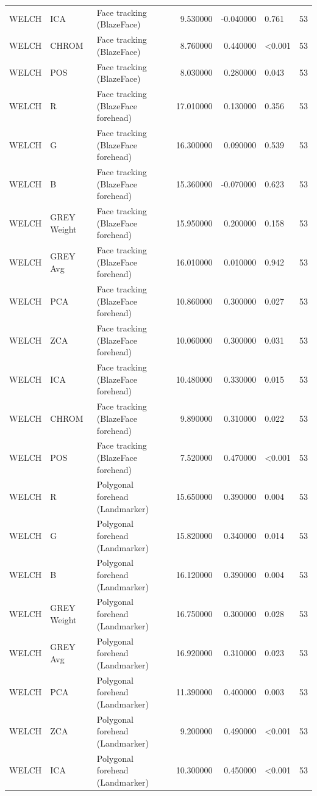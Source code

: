 \begin{table}[htbp]
\begin{tabular}{l l l r r l r}
WELCH & ICA & Face tracking (BlazeFace) & 9.530000 & -0.040000 & 0.761 & 53 \\
WELCH & CHROM & Face tracking (BlazeFace) & 8.760000 & 0.440000 & <0.001 & 53 \\
WELCH & POS & Face tracking (BlazeFace) & 8.030000 & 0.280000 & 0.043 & 53 \\
WELCH & R & Face tracking (BlazeFace forehead) & 17.010000 & 0.130000 & 0.356 & 53 \\
WELCH & G & Face tracking (BlazeFace forehead) & 16.300000 & 0.090000 & 0.539 & 53 \\
WELCH & B & Face tracking (BlazeFace forehead) & 15.360000 & -0.070000 & 0.623 & 53 \\
WELCH & GREY Weight & Face tracking (BlazeFace forehead) & 15.950000 & 0.200000 & 0.158 & 53 \\
WELCH & GREY Avg & Face tracking (BlazeFace forehead) & 16.010000 & 0.010000 & 0.942 & 53 \\
WELCH & PCA & Face tracking (BlazeFace forehead) & 10.860000 & 0.300000 & 0.027 & 53 \\
WELCH & ZCA & Face tracking (BlazeFace forehead) & 10.060000 & 0.300000 & 0.031 & 53 \\
WELCH & ICA & Face tracking (BlazeFace forehead) & 10.480000 & 0.330000 & 0.015 & 53 \\
WELCH & CHROM & Face tracking (BlazeFace forehead) & 9.890000 & 0.310000 & 0.022 & 53 \\
WELCH & POS & Face tracking (BlazeFace forehead) & 7.520000 & 0.470000 & <0.001 & 53 \\
WELCH & R & Polygonal forehead (Landmarker) & 15.650000 & 0.390000 & 0.004 & 53 \\
WELCH & G & Polygonal forehead (Landmarker) & 15.820000 & 0.340000 & 0.014 & 53 \\
WELCH & B & Polygonal forehead (Landmarker) & 16.120000 & 0.390000 & 0.004 & 53 \\
WELCH & GREY Weight & Polygonal forehead (Landmarker) & 16.750000 & 0.300000 & 0.028 & 53 \\
WELCH & GREY Avg & Polygonal forehead (Landmarker) & 16.920000 & 0.310000 & 0.023 & 53 \\
WELCH & PCA & Polygonal forehead (Landmarker) & 11.390000 & 0.400000 & 0.003 & 53 \\
WELCH & ZCA & Polygonal forehead (Landmarker) & 9.200000 & 0.490000 & <0.001 & 53 \\
WELCH & ICA & Polygonal forehead (Landmarker) & 10.300000 & 0.450000 & <0.001 & 53 \\

\end{tabular}
\end{table}
